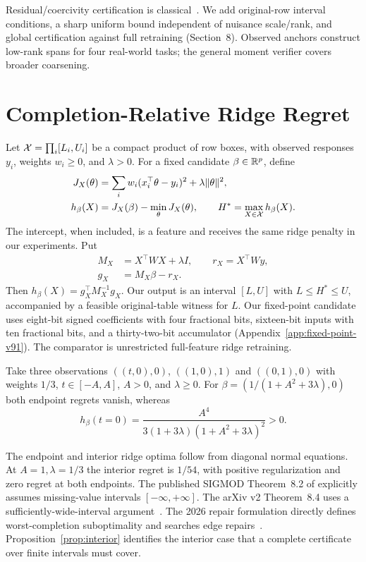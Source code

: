 Residual/coercivity certification is classical~\citep{quarteroni2011,balabanov2019}. We add original-row interval conditions, a sharp uniform bound independent of nuisance scale/rank, and global certification against full retraining (Section~8). Observed anchors construct low-rank spans for four real-world tasks; the general moment verifier covers broader coarsening.
\section{Completion-Relative Ridge Regret}
Let $\mathcal X=\prod_i[L_i,U_i]$ be a compact product of row boxes, with observed responses $y_i$, weights $w_i\geq0$, and $\lambda>0$. For a fixed candidate $\beta\in\mathbb R^p$, define
\begin{align}
 J_X(\theta)&=\sum_iw_i(x_i^\top\theta-y_i)^2+\lambda\|\theta\|^2,\\
 h_\beta(X)&=J_X(\beta)-\min_\theta J_X(\theta),\qquad
 H^*=\max_{X\in\mathcal X}h_\beta(X).\label{eq:target}
\end{align}
The intercept, when included, is a feature and receives the same ridge penalty in our experiments. Put
\begin{align}
 M_X&=X^\top W X+\lambda I,\qquad r_X=X^\top Wy,\nonumber\\
 g_X&=M_X\beta-r_X.
\end{align}
Then $h_\beta(X)=g_X^\top M_X^{-1}g_X$. Our output is an interval $[L,U]$ with $L\leq H^*\leq U$, accompanied by a feasible original-table witness for $L$. Our fixed-point candidate uses eight-bit signed coefficients with four fractional bits, sixteen-bit inputs with ten fractional bits, and a thirty-two-bit accumulator (Appendix~\ref{app:fixed-point-v91}). The comparator is unrestricted full-feature ridge retraining.

\begin{proposition}\label{prop:interior}
Take three observations $((t,0),0)$, $((1,0),1)$ and $((0,1),0)$ with weights $1/3$, $t\in[-A,A]$, $A>0$, and $\lambda\geq0$. For $\beta=(1/(1+A^2+3\lambda),0)$ both endpoint regrets vanish, whereas
\[
 h_\beta(t=0)=\frac{A^4}{3(1+3\lambda)(1+A^2+3\lambda)^2}>0.
\]
\end{proposition}
The endpoint and interior ridge optima follow from diagonal normal equations. At $A=1,\lambda=1/3$ the interior regret is $1/54$, with positive regularization and zero regret at both endpoints. The published SIGMOD Theorem~8.2 of \citet{zhen2024sigmod} explicitly assumes missing-value intervals $[-\infty,+\infty]$. The arXiv v2 Theorem~8.4 uses a sufficiently-wide-interval argument~\citep{zhen2024}. The 2026 repair formulation directly defines worst-completion suboptimality and searches edge repairs~\citep[Section~4.1]{repair2026}. Proposition~\ref{prop:interior} identifies the interior case that a complete certificate over finite intervals must cover.

